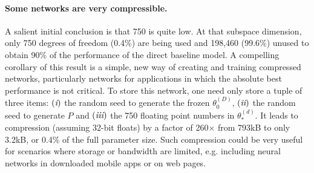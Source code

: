 \documentclass{article} %
\newcommand{\thetads}{\theta^{(d)}_*}
\newcommand{\thetaDo}{\theta^{(D)}_0}
\begin{document}
\paragraph{Some networks are very compressible.}
A salient initial conclusion is that 750 is quite low. At that subspace dimension, only 750 degrees of freedom (0.4\%) are being used and 198,460 (99.6\%) unused to obtain 90\% of the performance of the direct baseline model.
A compelling corollary of this result is a simple, new way of creating and training compressed networks, particularly networks for applications in which the absolute best performance is not critical. To store this network, one need only store a tuple of three items:
$(\RN{1})$ the random seed to generate the frozen $\thetaDo$,
$(\RN{2})$ the random seed to generate $P$ and $(\RN{3})$ the 750 floating point numbers in $\thetads$. It leads to compression (assuming 32-bit floats) by a factor of 260$\times$ from 793kB to only 3.2kB, or 0.4\% of the full parameter size. Such compression could be very useful for scenarios where storage or bandwidth are limited, e.g. including neural networks in downloaded mobile apps or on web pages.
\end{document}
